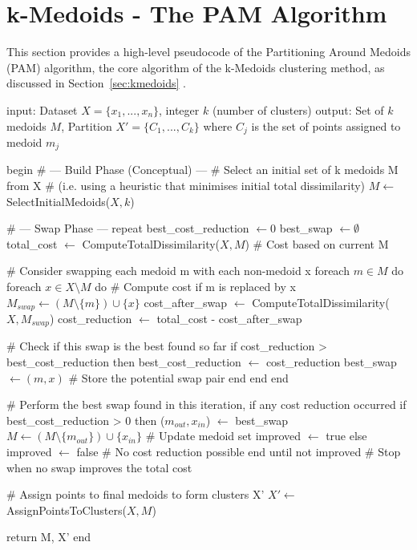 \documentclass[10pt,oneside]{report}
\begin{document}
\clearpage
\section{k-Medoids - The PAM Algorithm}\label{app:pam}
This section provides a high-level pseudocode of the Partitioning Around Medoids (PAM) algorithm, the core algorithm of the k-Medoids clustering method, as discussed in Section~\ref{sec:kmedoids} \cite{kmedoids}.

\begin{algorithm}[caption={Partitioning Around Medoids (PAM).}, label={alg:pam}]
input: Dataset $X = \{x_1, ..., x_n\}$, integer $k$ (number of clusters)
output: Set of $k$ medoids $M$, Partition $X' = \{C_1, ..., C_k\}$ where $C_j$ is the set of points assigned to medoid $m_j$

begin
    # --- Build Phase (Conceptual) ---
    # Select an initial set of k medoids M from X
    # (i.e. using a heuristic that minimises initial total dissimilarity)
    $M \gets$ SelectInitialMedoids($X, k$)

    # --- Swap Phase ---
    repeat
        best_cost_reduction $\gets 0$
        best_swap $\gets \emptyset$ 
        total_cost $\gets$ ComputeTotalDissimilarity($X, M$) # Cost based on current M

        # Consider swapping each medoid m with each non-medoid x
        foreach $m \in M$ do
            foreach $x \in X \setminus M$ do
                # Compute cost if m is replaced by x
                $M_{swap} \gets (M \setminus \{m\}) \cup \{x\}$
                cost_after_swap $\gets$ ComputeTotalDissimilarity($X, M_{swap}$)
                cost_reduction $\gets$ total_cost - cost_after_swap

                # Check if this swap is the best found so far
                if cost_reduction > best_cost_reduction then
                    best_cost_reduction $\gets$ cost_reduction
                    best_swap $\gets (m, x)$ # Store the potential swap pair
                end
            end
        end

        # Perform the best swap found in this iteration, if any cost reduction occurred
        if best_cost_reduction > 0 then
            ($m_{out}, x_{in}$) $\gets$ best_swap
            $M \gets (M \setminus \{m_{out}\}) \cup \{x_{in}\}$ # Update medoid set
            improved $\gets$ true
        else
            improved $\gets$ false # No cost reduction possible
        end
    until not improved # Stop when no swap improves the total cost

    # Assign points to final medoids to form clusters X'
    $X' \gets$ AssignPointsToClusters($X, M$)

    return M, X'
end
\end{algorithm}
\end{document}
